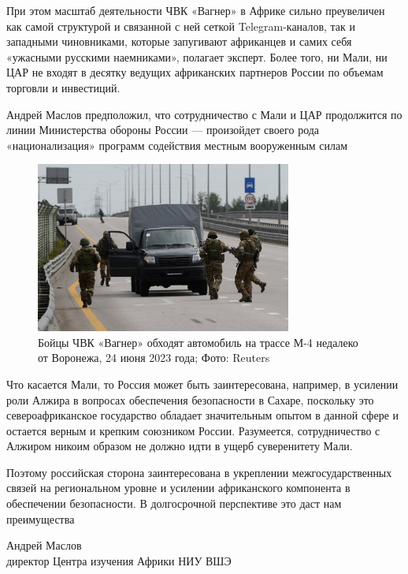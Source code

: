 При этом масштаб деятельности ЧВК «Вагнер» в Африке сильно преувеличен как самой структурой и связанной с ней сеткой Telegram-каналов, так и западными чиновниками, которые запугивают африканцев и самих себя «ужасными русскими наемниками», полагает эксперт. Более того, ни Мали, ни ЦАР не входят в десятку ведущих африканских партнеров России по объемам торговли и инвестиций.

\begin{center}
    \Large
    Андрей Маслов предположил, что сотрудничество с Мали и ЦАР продолжится по линии Министерства обороны России — произойдет своего рода «национализация» программ содействия местным вооруженным силам
\end{center}

\begin{figure}[h]
    \centering
    \includegraphics[width=0.75\textwidth]{img/pmc_africa_4.jpg}
    \caption{Бойцы ЧВК «Вагнер» обходят автомобиль на трассе М-4 недалеко от Воронежа, 24 июня 2023 года; Фото: Reuters}
\end{figure}

Что касается Мали, то Россия может быть заинтересована, например, в усилении роли Алжира в вопросах обеспечения безопасности в Сахаре, поскольку это североафриканское государство обладает значительным опытом в данной сфере и остается верным и крепким союзником России. Разумеется, сотрудничество с Алжиром никоим образом не должно идти в ущерб суверенитету Мали.

\begin{fancyquotes}
    Поэтому российская сторона заинтересована в укреплении межгосударственных связей на региональном уровне и усилении африканского компонента в обеспечении безопасности. В долгосрочной перспективе это даст нам преимущества

    \begin{flushright}
        Андрей Маслов\\
        директор Центра изучения Африки НИУ ВШЭ
    \end{flushright}

\end{fancyquotes}

